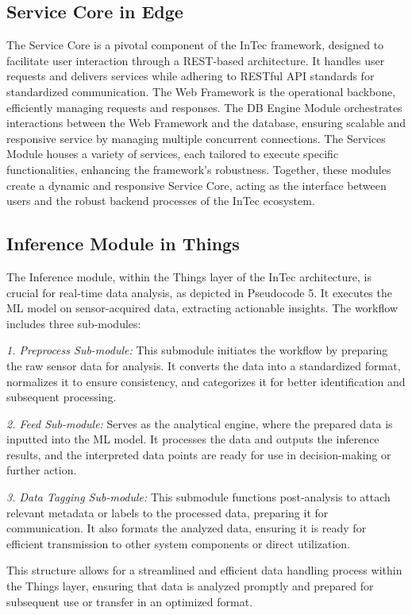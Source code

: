 \documentclass[11pt]{article}
\begin{document}
	\subsection{Service Core in Edge}
	The Service Core is a pivotal component of the InTec framework, designed to
	facilitate user interaction through a REST-based architecture. It handles user
	requests and delivers services while adhering to RESTful API standards for
	standardized communication. The Web Framework is the operational backbone,
	efficiently managing requests and responses. The DB Engine Module orchestrates
	interactions between the Web Framework and the database, ensuring scalable and
	responsive service by managing multiple concurrent connections. The Services
	Module houses a variety of services, each tailored to execute specific functionalities, enhancing the framework’s robustness. Together, these modules create a
	dynamic and responsive Service Core, acting as the interface between users and
	the robust backend processes of the InTec ecosystem.
	
	\subsection{Inference Module in Things}
	The Inference module, within the Things layer of the InTec architecture, is crucial
	for real-time data analysis, as depicted in Pseudocode 5. It executes the ML model
	on sensor-acquired data, extracting actionable insights. The workflow includes three
	sub-modules:
	
	\textit{1. Preprocess Sub-module:} This submodule initiates the workflow by preparing
	the raw sensor data for analysis. It converts the data into a standardized format,
	normalizes it to ensure consistency, and categorizes it for better identification and
	subsequent processing.
	
	\textit{2. Feed Sub-module:}  Serves as the analytical engine, where the prepared data is
	inputted into the ML model. It processes the data and outputs the inference
	results, and the interpreted data points are ready for use in decision-making or
	further action.
	
	\textit{3. Data Tagging Sub-module:} This submodule functions post-analysis to attach relevant metadata or labels to the processed data, preparing it for communication. It also formats the analyzed data, ensuring it is ready for efficient transmission to other system components or direct utilization.
	
	This structure allows for a streamlined and efficient data handling process within
	the Things layer, ensuring that data is analyzed promptly and prepared for subsequent use or transfer in an optimized format.
	
\end{document}
